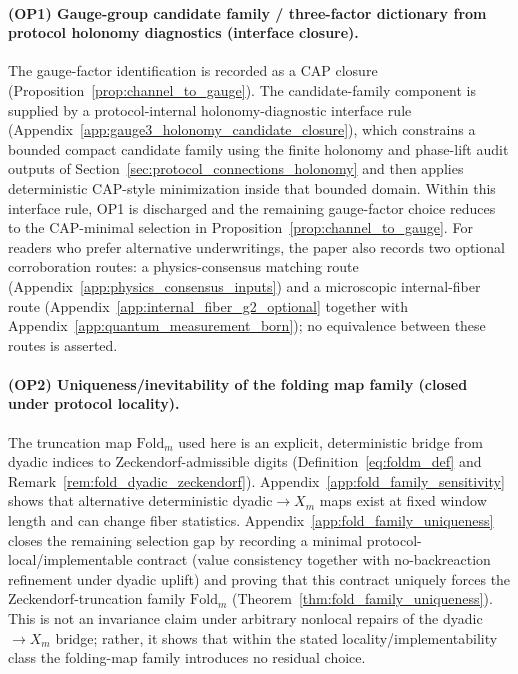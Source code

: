 \paragraph{(OP1) Gauge-group candidate family / three-factor dictionary from protocol holonomy diagnostics (interface closure).}
The gauge-factor identification is recorded as a CAP closure (Proposition~\ref{prop:channel_to_gauge}).
The candidate-family component is supplied by a protocol-internal holonomy-diagnostic interface rule (Appendix~\ref{app:gauge3_holonomy_candidate_closure}), which constrains a bounded compact candidate family using the finite holonomy and phase-lift audit outputs of Section~\ref{sec:protocol_connections_holonomy} and then applies deterministic CAP-style minimization inside that bounded domain.
Within this interface rule, OP1 is discharged and the remaining gauge-factor choice reduces to the CAP-minimal selection in Proposition~\ref{prop:channel_to_gauge}.
For readers who prefer alternative underwritings, the paper also records two optional corroboration routes: a physics-consensus matching route (Appendix~\ref{app:physics_consensus_inputs}) and a microscopic internal-fiber route (Appendix~\ref{app:internal_fiber_g2_optional} together with Appendix~\ref{app:quantum_measurement_born}); no equivalence between these routes is asserted.

\paragraph{(OP2) Uniqueness/inevitability of the folding map family (closed under protocol locality).}
The truncation map $\mathrm{Fold}_m$ used here is an explicit, deterministic bridge from dyadic indices to Zeckendorf-admissible digits
(Definition~\eqref{eq:foldm_def} and Remark~\ref{rem:fold_dyadic_zeckendorf}).
Appendix~\ref{app:fold_family_sensitivity} shows that alternative deterministic dyadic$\to X_m$ maps exist at fixed window length and can change fiber statistics.
Appendix~\ref{app:fold_family_uniqueness} closes the remaining selection gap by recording a minimal protocol-local/implementable contract (value consistency together with no-backreaction refinement under dyadic uplift) and proving that this contract uniquely forces the Zeckendorf-truncation family $\mathrm{Fold}_m$ (Theorem~\ref{thm:fold_family_uniqueness}).
This is not an invariance claim under arbitrary nonlocal repairs of the dyadic$\to X_m$ bridge; rather, it shows that within the stated locality/implementability class the folding-map family introduces no residual choice.

